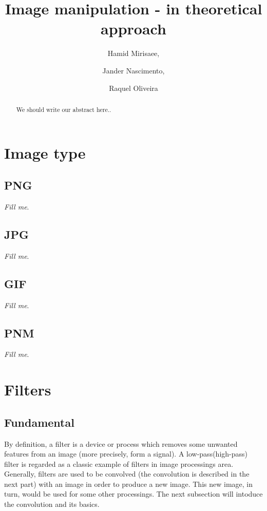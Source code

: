 \documentclass{report}
\begin{document}
\title{Image manipulation - in theoretical approach}

\author{Hamid Mirisaee,
\and Jander Nascimento, 
\and Raquel Oliveira}

\maketitle

\begin{abstract}

We should write our abstract here..

\end{abstract}

\tableofcontents

\vfill

\section{Image type}

	\subsection{PNG}

		\textit{Fill me}.

	\subsection{JPG}

		\textit{Fill me}.

	\subsection{GIF}

		\textit{Fill me}.

	\subsection{PNM}

		\textit{Fill me}.

\section{Filters}

	\subsection{Fundamental}

		By definition, a filter is a device or process which removes some unwanted features from an image (more precisely, form a signal).
		A low-pass(high-pass) filter is regarded as a classic example of filters in image processings area. Generally, filters are used to be convolved 
		(the convolution is described in the 
		next part) with an image in order to produce a new image. This new image, in turn, would be used for some other processings. The next subsection will
		intoduce the convolution and its basics.
		
\end{document}
